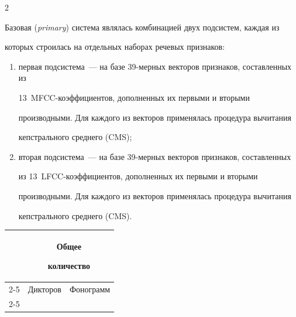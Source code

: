 \begin{multicols}{2}
  


  Базовая (\textit{primary}) система являлась комбинацией двух подсистем, каждая из 


которых строилась на отдельных наборах речевых признаков:


  \begin{enumerate}[(1)]


  \item


  первая подсистема~--- на базе 39-мер\-ных векторов признаков, составленных из 


13~MFCC-ко\-эф\-фи\-ци\-ен\-тов, дополненных их первыми и вторыми 


производными. Для каждого из векторов применялась процедура вычитания 


кепстрального среднего (CMS);


  \item


  вторая подсистема~--- на базе 39-мер\-ных векторов признаков, составленных 


из 13~LFCC-ко\-эф\-фи\-ци\-ен\-тов, дополненных их первыми и вторыми 


производными. Для каждого из векторов применялась процедура вычитания 


кепстрального среднего (CMS).


\end{enumerate}





\begin{table}\small %


\begin{center}




\vspace*{2ex}





\begin{tabular}{|l|l|c|l|c|}


\hline


&\multicolumn{4}{c|}{Общее 


количество}\\


\cline{2-5}


\multicolumn{1}{|c|}{Каналы}&\multicolumn{2}{c|}{Дикторов} & \multicolumn{2}{c|}{Фонограмм}\\


\cline{2-5}



\end{tabular}
\end{center}
\end{table}
\end{multicols}
